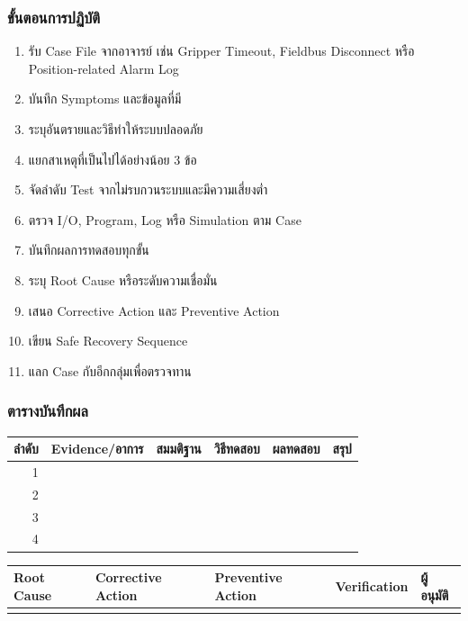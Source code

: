 \subsubsection{ขั้นตอนการปฏิบัติ}

\begin{enumerate}
    \item รับ Case File จากอาจารย์ เช่น Gripper Timeout, Fieldbus Disconnect หรือ Position-related Alarm Log
    \item บันทึก Symptoms และข้อมูลที่มี
    \item ระบุอันตรายและวิธีทำให้ระบบปลอดภัย
    \item แยกสาเหตุที่เป็นไปได้อย่างน้อย 3 ข้อ
    \item จัดลำดับ Test จากไม่รบกวนระบบและมีความเสี่ยงต่ำ
    \item ตรวจ I/O, Program, Log หรือ Simulation ตาม Case
    \item บันทึกผลการทดสอบทุกขั้น
    \item ระบุ Root Cause หรือระดับความเชื่อมั่น
    \item เสนอ Corrective Action และ Preventive Action
    \item เขียน Safe Recovery Sequence
    \item แลก Case กับอีกกลุ่มเพื่อตรวจทาน
\end{enumerate}

\subsubsection{ตารางบันทึกผล}

\begin{table}[htbp]
    \centering
    \begin{tabular}{r l l l l l}
        \hline
        \textbf{ลำดับ} & \textbf{Evidence/อาการ} & \textbf{สมมติฐาน} & \textbf{วิธีทดสอบ} & \textbf{ผลทดสอบ} & \textbf{สรุป} \\
        \hline
        1 &  &  &  &  &  \\
        2 &  &  &  &  &  \\
        3 &  &  &  &  &  \\
        4 &  &  &  &  &  \\
        \hline
    \end{tabular}
\end{table}

\begin{table}[htbp]
    \centering
    \begin{tabular}{l l l l l}
        \hline
        \textbf{Root Cause} & \textbf{Corrective Action} & \textbf{Preventive Action} & \textbf{Verification} & \textbf{ผู้อนุมัติ} \\
        \hline
         &  &  &  &  \\
        \hline
    \end{tabular}
\end{table}

